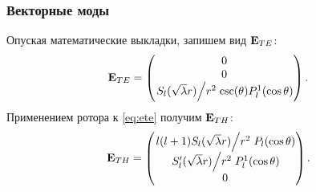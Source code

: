 \documentclass[compress]{beamer}
\begin{document}

    \begin{frame}\frametitle{Векторные моды}

        Опуская математические выкладки, запишем вид $\vb{E}_{TE}$:
        \begin{equation}\label{eq:ete}
            \vb{E}_{TE} = \begin{pmatrix}
                0 \\ 0 \\ \flatfrac{S_l(\sqrt\lambda r)}{r^2} \csc(\theta) P^1_l(\cos\theta)
            \end{pmatrix} .
        \end{equation}
        Применением ротора к \autoref{eq:ete} получим $\vb{E}_{TH}$:
        \begin{equation}\label{eq:eth}
            \vb{E}_{TH} = \begin{pmatrix}
                \flatfrac{l(l+1) S_l(\sqrt\lambda r)}{r^2} P_l(\cos\theta) \\
                \flatfrac{S_l'(\sqrt\lambda r)}{r^2} P_l^1(\cos\theta) \\
                0
            \end{pmatrix} .
        \end{equation}

    \end{frame}

\end{document}
